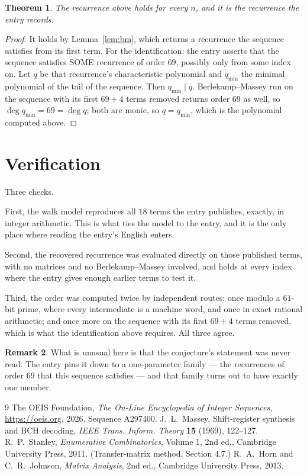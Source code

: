 \documentclass[11pt,a4paper]{article}
\theoremstyle{plain}
\newtheorem{theorem}{Theorem}
\theoremstyle{definition}
\newtheorem{remark}[theorem]{Remark}
\begin{document}
\begin{theorem}
The recurrence above holds for every $n$, and it is the recurrence the entry records.
\end{theorem}

\begin{proof}
It holds by Lemma~\ref{lem:bm}, which returns a recurrence the sequence satisfies from its
first term. For the identification: the entry asserts that the sequence satisfies SOME
recurrence of order $69$, possibly only from some index on. Let $q$ be that recurrence's
characteristic polynomial and $q_{\min}$ the minimal polynomial of the tail of the sequence.
Then $q_{\min}\mid q$. Berlekamp--Massey run on the sequence with its first $69+4$ terms
removed returns order $69$ as well, so $\deg q_{\min}=69=\deg q$; both are monic, so
$q=q_{\min}$, which is the polynomial computed above.
\end{proof}

\section{Verification}

Three checks.

First, the walk model reproduces all $18$ terms the entry publishes, exactly, in integer
arithmetic. This is what ties the model to the entry, and it is the only place where reading
the entry's English enters.

Second, the recovered recurrence was evaluated directly on those published terms, with no
matrices and no Berlekamp--Massey involved, and holds at every index where the entry gives
enough earlier terms to test it.

Third, the order was computed twice by independent routes: once modulo a $61$-bit prime, where
every intermediate is a machine word, and once in exact rational arithmetic; and once more on
the sequence with its first $69+4$ terms removed, which is what the identification above
requires. All three agree.

\begin{remark}
What is unusual here is that the conjecture's statement was never read. The entry pins it down
to a one-parameter family --- the recurrences of order $69$ that this sequence satisfies
--- and that family turns out to have exactly one member.
\end{remark}

\begin{thebibliography}{9}
 The OEIS Foundation, \emph{The On-Line Encyclopedia of Integer
Sequences}, \url{https://oeis.org}, 2026. Sequence A297400.
 J.~L.~Massey, Shift-register synthesis and BCH decoding, \emph{IEEE
Trans. Inform. Theory} \textbf{15} (1969), 122--127.
 R.~P.~Stanley, \emph{Enumerative Combinatorics}, Volume 1, 2nd ed.,
Cambridge University Press, 2011. (Transfer-matrix method, Section 4.7.)
 R.~A.~Horn and C.~R.~Johnson, \emph{Matrix Analysis}, 2nd ed., Cambridge
University Press, 2013.
\end{thebibliography}
\end{document}
